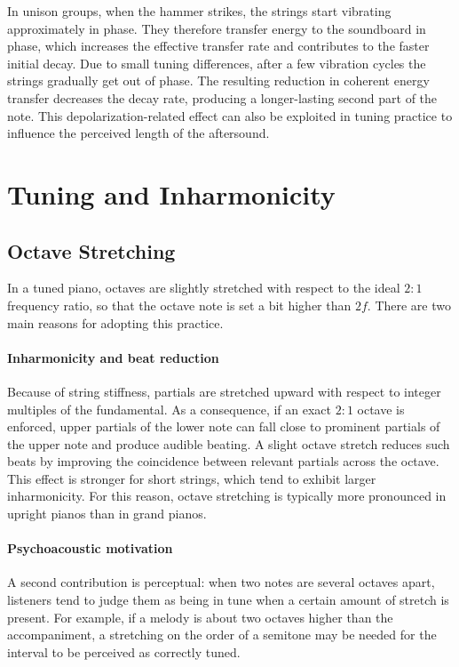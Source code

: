 In unison groups, when the hammer strikes, the strings start vibrating approximately in phase. They therefore transfer energy to the soundboard in phase, which increases the effective transfer rate and contributes to the faster initial decay. Due to small tuning differences, after a few vibration cycles the strings gradually get out of phase. The resulting reduction in coherent energy transfer decreases the decay rate, producing a longer-lasting second part of the note. This depolarization-related effect can also be exploited in tuning practice to influence the perceived length of the aftersound.

\section{Tuning and Inharmonicity}

\subsection{Octave Stretching}

In a tuned piano, octaves are slightly stretched with respect to the ideal \( 2:1 \) frequency ratio, so that the octave note is set a bit higher than \( 2f \). There are two main reasons for adopting this practice.

\paragraph{Inharmonicity and beat reduction} Because of string stiffness, partials are stretched upward with respect to integer multiples of the fundamental. As a consequence, if an exact \( 2:1 \) octave is enforced, upper partials of the lower note can fall close to prominent partials of the upper note and produce audible beating. A slight octave stretch reduces such beats by improving the coincidence between relevant partials across the octave. This effect is stronger for short strings, which tend to exhibit larger inharmonicity. For this reason, octave stretching is typically more pronounced in upright pianos than in grand pianos.

\paragraph{Psychoacoustic motivation} A second contribution is perceptual: when two notes are several octaves apart, listeners tend to judge them as being in tune when a certain amount of stretch is present. For example, if a melody is about two octaves higher than the accompaniment, a stretching on the order of a semitone may be needed for the interval to be perceived as correctly tuned.


